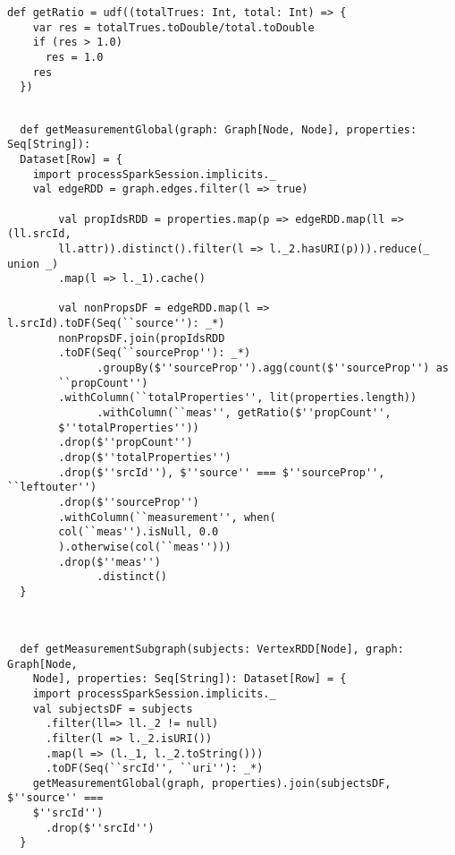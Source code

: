\lstset{escapechar=@,language=scala}
\begin{lstlisting}[caption={Cálculo del ratio},captionpos=b, label=graphmetricRatio]
  def getRatio = udf((totalTrues: Int, total: Int) => {
    var res = totalTrues.toDouble/total.toDouble
    if (res > 1.0)
      res = 1.0
    res
  })
\end{lstlisting}


\lstset{escapechar=@,language=scala}
\begin{lstlisting}[caption={Cálculo de la métrica en el grafo},captionpos=b, label=graphmetricSCglobal]

  def getMeasurementGlobal(graph: Graph[Node, Node], properties: Seq[String]):
  Dataset[Row] = {
    import processSparkSession.implicits._
    val edgeRDD = graph.edges.filter(l => true)

        val propIdsRDD = properties.map(p => edgeRDD.map(ll => (ll.srcId,
        ll.attr)).distinct().filter(l => l._2.hasURI(p))).reduce(_ union _)
        .map(l => l._1).cache()

        val nonPropsDF = edgeRDD.map(l => l.srcId).toDF(Seq(``source''): _*)
        nonPropsDF.join(propIdsRDD
        .toDF(Seq(``sourceProp''): _*)
              .groupBy($''sourceProp'').agg(count($''sourceProp'') as
        ``propCount'')
        .withColumn(``totalProperties'', lit(properties.length))
              .withColumn(``meas'', getRatio($''propCount'',
        $''totalProperties''))
        .drop($''propCount'')
        .drop($''totalProperties'')
        .drop($''srcId''), $''source'' === $''sourceProp'', ``leftouter'')
        .drop($''sourceProp'')
        .withColumn(``measurement'', when(
        col(``meas'').isNull, 0.0
        ).otherwise(col(``meas'')))
        .drop($''meas'')
              .distinct()
  }
  
\end{lstlisting}
\lstset{escapechar=@,language=scala}
\begin{lstlisting}[caption={Cálculo de la métrica en colección de nodos},captionpos=b, label=graphmetricSC]

  def getMeasurementSubgraph(subjects: VertexRDD[Node], graph: Graph[Node,
    Node], properties: Seq[String]): Dataset[Row] = {
    import processSparkSession.implicits._
    val subjectsDF = subjects
      .filter(ll=> ll._2 != null)
      .filter(l => l._2.isURI())
      .map(l => (l._1, l._2.toString()))
      .toDF(Seq(``srcId'', ``uri''): _*)
    getMeasurementGlobal(graph, properties).join(subjectsDF, $''source'' ===
    $''srcId'')
      .drop($''srcId'')
  }

\end{lstlisting}

